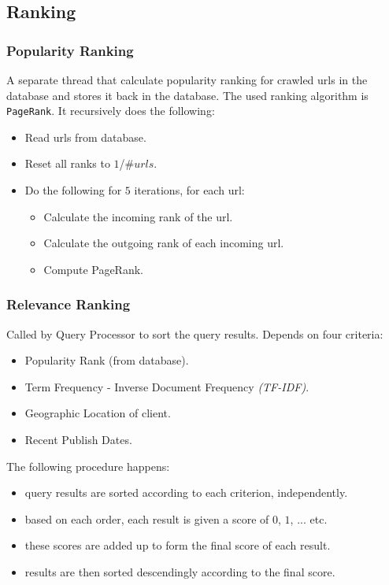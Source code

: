 \documentclass[12pt]{article}
\begin{document}
\subsection{Ranking}
\subsubsection{Popularity Ranking}
A separate thread that calculate popularity ranking for crawled urls in the database and stores it back in the database. The used ranking algorithm is \texttt{PageRank}. It recursively does the following:
\begin{itemize}
    \item Read urls from database.
    \item Reset all ranks to $1$/$\#urls$.
    \item Do the following for $5$ iterations, for each url:
    \begin{itemize}
        \item Calculate the incoming rank of the url.
        \item Calculate the outgoing rank of each incoming url.
        \item Compute PageRank.
    \end{itemize}
\end{itemize}

\subsubsection{Relevance Ranking}
Called by Query Processor to sort the query results. Depends on four criteria:
\begin{itemize}
    \item Popularity Rank (from database).
    \item Term Frequency - Inverse Document Frequency \emph{(TF-IDF)}.
    \item Geographic Location of client.
    \item Recent Publish Dates.
\end{itemize}
The following procedure happens:
\begin{itemize}
    \item query results are sorted according to each criterion, independently.
    \item based on each order, each result is given a score of $0$, $1$, ... etc.
    \item these scores are added up to form the final score of each result.
    \item results are then sorted descendingly according to the final score.
\end{itemize}
\end{document}
